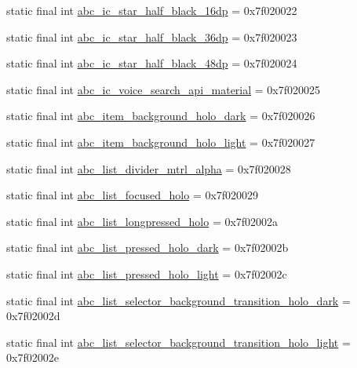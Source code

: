 \begin{CompactItemize}
static final int \hyperlink{classandroid_1_1support_1_1v4_1_1_r_1_1drawable_8368ac9dbc4989218306f804141b68a6}{abc\_\-ic\_\-star\_\-half\_\-black\_\-16dp} = 0x7f020022
\item 
static final int \hyperlink{classandroid_1_1support_1_1v4_1_1_r_1_1drawable_95a0f959c162b37c6907422e26f39f2d}{abc\_\-ic\_\-star\_\-half\_\-black\_\-36dp} = 0x7f020023
\item 
static final int \hyperlink{classandroid_1_1support_1_1v4_1_1_r_1_1drawable_be20c7ad8e9e2ca2798d1d3d13e35a6c}{abc\_\-ic\_\-star\_\-half\_\-black\_\-48dp} = 0x7f020024
\item 
static final int \hyperlink{classandroid_1_1support_1_1v4_1_1_r_1_1drawable_bf73f2114b7304f455a7f6eff1366689}{abc\_\-ic\_\-voice\_\-search\_\-api\_\-material} = 0x7f020025
\item 
static final int \hyperlink{classandroid_1_1support_1_1v4_1_1_r_1_1drawable_f3804fa6f438017f9612e3e18e592fc7}{abc\_\-item\_\-background\_\-holo\_\-dark} = 0x7f020026
\item 
static final int \hyperlink{classandroid_1_1support_1_1v4_1_1_r_1_1drawable_865f715504f89bb971ee21c169000b1b}{abc\_\-item\_\-background\_\-holo\_\-light} = 0x7f020027
\item 
static final int \hyperlink{classandroid_1_1support_1_1v4_1_1_r_1_1drawable_b4aa187c782dfd72c9a7213d0d3e3e06}{abc\_\-list\_\-divider\_\-mtrl\_\-alpha} = 0x7f020028
\item 
static final int \hyperlink{classandroid_1_1support_1_1v4_1_1_r_1_1drawable_1d8b96ca6902d5bc8258edc95187f1f0}{abc\_\-list\_\-focused\_\-holo} = 0x7f020029
\item 
static final int \hyperlink{classandroid_1_1support_1_1v4_1_1_r_1_1drawable_0f7a3604c90d0db26adc075dbea0f770}{abc\_\-list\_\-longpressed\_\-holo} = 0x7f02002a
\item 
static final int \hyperlink{classandroid_1_1support_1_1v4_1_1_r_1_1drawable_3f2b7508fb7c6320279de92e62ad5fa3}{abc\_\-list\_\-pressed\_\-holo\_\-dark} = 0x7f02002b
\item 
static final int \hyperlink{classandroid_1_1support_1_1v4_1_1_r_1_1drawable_3bf542d8d22061e9e30880a50b853b58}{abc\_\-list\_\-pressed\_\-holo\_\-light} = 0x7f02002c
\item 
static final int \hyperlink{classandroid_1_1support_1_1v4_1_1_r_1_1drawable_b80f1b4c8786ede1bcf592a40d978b60}{abc\_\-list\_\-selector\_\-background\_\-transition\_\-holo\_\-dark} = 0x7f02002d
\item 
static final int \hyperlink{classandroid_1_1support_1_1v4_1_1_r_1_1drawable_b7034a09c330e999fd8e540c3784b286}{abc\_\-list\_\-selector\_\-background\_\-transition\_\-holo\_\-light} = 0x7f02002e

\end{CompactItemize}
